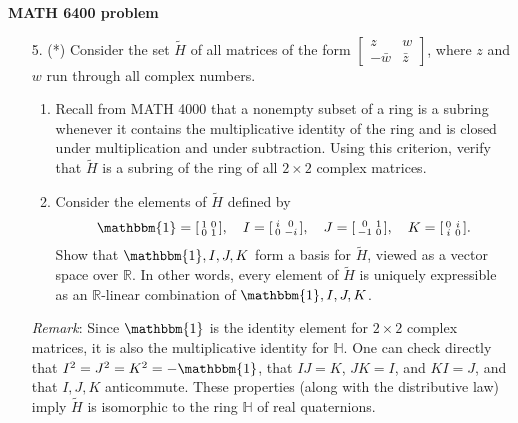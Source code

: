 \documentclass[11pt]{article}
\def\1{\mathbbm{1}}
\def\H{\mathbb{H}}
\def\R{\mathbb{R}}
\begin{document}
\noindent \textbf{MATH 6400 problem}

\begin{enumerate}
\item[5.] (*) Consider the set $\tilde{H}$ of all matrices of the form $[\begin{smallmatrix}z & w \\ -\bar{w} & \bar{z}\end{smallmatrix}]$, where $z$ and $w$ run through all complex numbers.
\begin{enumerate}
\item Recall from MATH 4000 that a nonempty subset of a ring is a subring whenever it contains the multiplicative identity of the ring and is closed under multiplication and under subtraction. Using this criterion, verify that $\tilde{H}$ is a subring of the ring of all $2\times 2$ complex matrices.
\item Consider the elements of $\tilde{H}$ defined by
\[ \1 = [\begin{smallmatrix}1 & 0 \\ 0 & 1\end{smallmatrix}],\quad I = [\begin{smallmatrix}i & 0 \\ 0 & -i\end{smallmatrix}], \quad J = [\begin{smallmatrix}0 & 1\\ -1 & 0\end{smallmatrix}], \quad K = [\begin{smallmatrix}0 & i \\ i & 0\end{smallmatrix}].\]
Show that $\1, I, J, K$ form a basis for $\tilde{H}$, viewed as a vector space over $\R$. In other words, every element of $\tilde{H}$ is uniquely expressible as an $\R$-linear combination of $\1, I, J, K$.
\end{enumerate}

{\scriptsize \emph{Remark}: Since $\1$ is the identity element for $2\times 2$ complex matrices, it is also the multiplicative identity for $\H$. One can check directly that $I^2=J^2=K^2=-\1$, that $IJ=K$, $JK=I$, and $KI=J$, and that $I, J, K$ anticommute. These properties (along with the distributive law) imply $\tilde{H}$ is isomorphic to the ring $\H$ of real quaternions.}



\end{enumerate}
\end{document}
